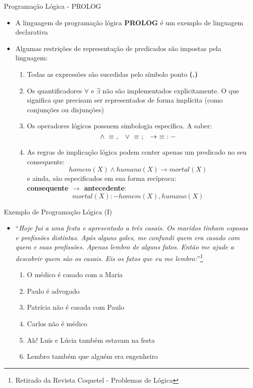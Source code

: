 \begin{frame}[t]{Programação Lógica - PROLOG}
	\begin{itemize}
	\item A linguagem de programação lógica {\bf PROLOG} é um exemplo de linguagem declarativa
	
	\item Algumas restrições de representação de predicados são impostas pela linguagem:
	\begin{footnotesize}
	\begin{enumerate}
	\item Todas as expressões são sucedidas pelo símbolo ponto {\bf (.)}
	\item Os quantificadores $\forall$ e $\exists$ não são implementados explicitamente. O que significa que precisam ser representados de forma implícita (como conjunções ou disjunções)
	\item Os operadores lógicos possuem simbologia específica. A saber: $$\wedge ~\equiv~ , \hspace{0.3cm} \vee ~\equiv~ ; \hspace{0.3cm} \rightarrow ~\equiv~ :-$$
	\item As regras de implicação lógica podem conter apenas um predicado no seu consequente: $$homem(X) \wedge humano(X) \rightarrow mortal(X)$$ e ainda, são especificados em sua forma recíproca:\\ {\bf consequente $\rightarrow$ antecedente}: {\scriptsize $$mortal(X) :- homem(X),humano(X)$$}
	\end{enumerate}
	\end{footnotesize}
	\end{itemize}
\end{frame}

\begin{frame}[t]{Exemplo de Programação Lógica (I)}
	\begin{itemize}
	\item ``{\em Hoje fui a uma festa e apresentado a três casais. Os maridos tinham esposas e profissões distintas. Após alguns goles, me confundi quem era casado com quem e suas profissões. Apenas lembro de alguns fatos. Então me ajude a descobrir quem são os casais. Eis os fatos que eu me lembro:}''\footnote{Retirado da Revista Coquetel - Problemas de Lógica}
	\begin{enumerate}
	\item O médico é casado com a Maria
	\item Paulo é advogado
	\item Patrícia não é casada com Paulo
	\item Carlos não é médico
	\item Ah! Luis e Lúcia também estavam na festa
	\item Lembro também que alguém era engenheiro
	\end{enumerate}	 
	\end{itemize}
\end{frame}

